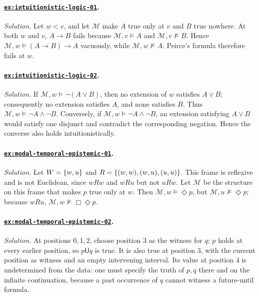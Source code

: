 \documentclass[11pt,oneside,openany]{book}
\theoremstyle{definition}
\theoremstyle{plain}
\theoremstyle{remark}
\DeclarePairedDelimiter{\set}{\lbrace}{\rbrace}
\newcommand{\entails}{\models}
\newcommand{\notentails}{\not\models}
\begin{document}
\paragraph{\hyperref[ex:intuitionistic-logic-01]{\texttt{ex:intuitionistic-logic-01}}.}
\textit{Solution.}  Let \(w<v\), and let \(\mathcal M\) make \(A\) true only
at \(v\) and \(B\) true nowhere.  At both \(w\) and \(v\), \(A\to B\) fails
because \(\mathcal M,v\entails A\) and \(\mathcal M,v\notentails B\).
Hence \(\mathcal M,w\entails(A\to B)\to A\) vacuously, while
\(\mathcal M,w\notentails A\).  Peirce's formula therefore fails at \(w\).

\paragraph{\hyperref[ex:intuitionistic-logic-02]{\texttt{ex:intuitionistic-logic-02}}.}
\textit{Solution.}  If \(\mathcal M,w\entails\neg(A\lor B)\), then no
extension of \(w\) satisfies \(A\lor B\); consequently no extension satisfies
\(A\), and none satisfies \(B\).  Thus
\(\mathcal M,w\entails\neg A\land\neg B\).  Conversely, if
\(\mathcal M,w\entails\neg A\land\neg B\), an extension satisfying
\(A\lor B\) would satisfy one disjunct and contradict the corresponding
negation.  Hence the converse also holds intuitionistically.

\paragraph{\hyperref[ex:modal-temporal-epistemic-01]{\texttt{ex:modal-temporal-epistemic-01}}.}
\textit{Solution.}  Let \(W=\set{w,u}\) and
\(R=\set{(w,w),(w,u),(u,u)}\).  This frame is reflexive and is not Euclidean,
since \(wRw\) and \(wRu\) but not \(uRw\).  Let \(\mathcal M\) be the
structure on this frame that makes \(p\) true only at \(w\).
Then \(\mathcal M,w\entails\Diamond p\), but
\(\mathcal M,u\notentails\Diamond p\); because \(wRu\),
\(\mathcal M,w\notentails\Box\Diamond p\).

\paragraph{\hyperref[ex:modal-temporal-epistemic-02]{\texttt{ex:modal-temporal-epistemic-02}}.}
\textit{Solution.}  At positions \(0,1,2\), choose position \(3\) as the
witness for \(q\); \(p\) holds at every earlier position, so
\(p\mathbin{\mathsf U}q\) is true.  It is also true at position \(3\), with
the current position as witness and an empty intervening interval.  Its value
at position \(4\) is undetermined from the data: one must specify the truth of
\(p,q\) there and on the infinite continuation, because a past occurrence of
\(q\) cannot witness a future-until formula.
\end{document}
